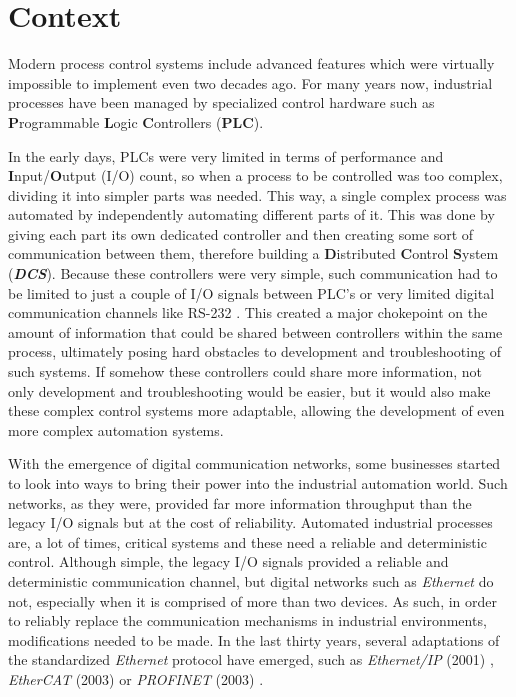 \section{Context} \label{sec:context}

Modern process control systems include advanced features which were virtually impossible to implement even two decades ago. For many years now, industrial processes have been managed by specialized control hardware such as \textbf Programmable \textbf Logic \textbf Controllers ({\bfseries PLC}).

In the early days, PLCs were very limited in terms of performance and \textbf Input/\textbf Output (I/O) count, so when a process to be controlled was too complex, dividing it into simpler parts was needed. This way, a single complex process was automated by independently automating different parts of it. This was done by giving each part its own dedicated controller and then creating some sort of communication between them, therefore building a \textbf Distributed \textbf Control \textbf System ({\bfseries\itshape DCS}). Because these controllers were very simple, such communication had to be limited to just a couple of I/O signals between PLC's or very limited digital communication channels like RS-232 \cite{protocol:rs232}. This created a major chokepoint on the amount of information that could be shared between controllers within the same process, ultimately posing hard obstacles to development and troubleshooting of such systems. If somehow these controllers could share more information, not only development and troubleshooting would be easier, but it would also make these complex control systems more adaptable, allowing the development of even more complex automation systems.

With the emergence of digital communication networks, some businesses started to look into ways to bring their power into the industrial automation world. Such networks, as they were, provided far more information throughput than the legacy I/O signals but at the cost of reliability. Automated industrial processes are, a lot of times, critical systems and these need a reliable and deterministic control. Although simple, the legacy I/O signals provided a reliable and deterministic communication channel, but digital networks such as \emph{Ethernet} \cite{protocol:ethernet} do not, especially when it is comprised of more than two devices. As such, in order to reliably replace the communication mechanisms in industrial environments, modifications needed to be made. In the last thirty years, several adaptations of the standardized \emph{Ethernet} protocol have emerged, such as \emph{Ethernet/IP} (2001) \cite{protocol:ethernetip}, \emph{EtherCAT} (2003) \cite{protocol:ethercat} or \emph{PROFINET} (2003) \cite{protocol:profinet}.

